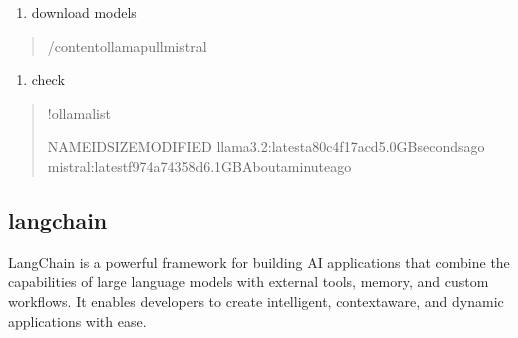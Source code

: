 \documentclass[letterpaper,11pt,english]{sphinxmanual}
\begin{document}
\begin{itemize}
\begin{quote}
\begin{figure}[htbp]
\centering

\noindent{}
\end{figure}
\end{quote}
\begin{enumerate}
%
\setcounter{enumi}{3}
\item {} 
\sphinxAtStartPar
download models

\end{enumerate}
\begin{quote}

\begin{sphinxVerbatim}[commandchars=\\\{\}]
/content\PYGZsh{}ollamapullmistral
\end{sphinxVerbatim}

\begin{figure}[htbp]
\centering

\noindent{}
\end{figure}
\end{quote}
\begin{enumerate}
%
\setcounter{enumi}{4}
\item {} 
\sphinxAtStartPar
check

\end{enumerate}
\begin{quote}

\begin{sphinxVerbatim}[commandchars=\\\{\}]
!ollamalist

NAMEIDSIZEMODIFIED
llama3.2:latesta80c4f17acd5.0GBsecondsago
mistral:latestf974a74358d6.1GBAboutaminuteago
\end{sphinxVerbatim}
\end{quote}

\end{itemize}


\subsection{langchain}
\label{\detokenize{prelim:langchain}}
\sphinxAtStartPar
LangChain is a powerful framework for building AI applications that combine the
capabilities of large language models with external tools, memory, and custom
workflows. It enables developers to create intelligent, context\sphinxhyphen{}aware,
and dynamic applications with ease.
\end{document}
